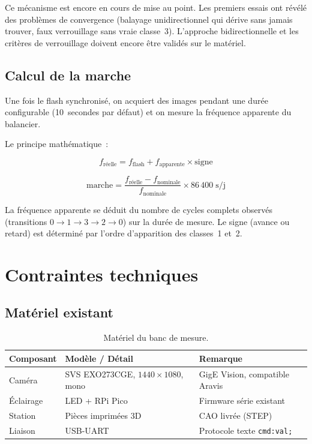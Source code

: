 \documentclass[a4paper,11pt]{article}
\newcommand{\code}[1]{\colorbox{codebg}{\texttt{#1}}}
\begin{document}
Ce mécanisme est encore en cours de mise au point. Les premiers essais ont révélé des problèmes de convergence (balayage unidirectionnel qui dérive sans jamais trouver, faux verrouillage sans vraie classe~3). L'approche bidirectionnelle et les critères de verrouillage doivent encore être validés sur le matériel.

\subsection{Calcul de la marche}

Une fois le flash synchronisé, on acquiert des images pendant une durée configurable (10~secondes par défaut) et on mesure la fréquence apparente du balancier.

Le principe mathématique~:

\begin{equation}
    f_{\text{réelle}} = f_{\text{flash}} + f_{\text{apparente}} \times \text{signe}
\end{equation}

\begin{equation}
    \text{marche} = \frac{f_{\text{réelle}} - f_{\text{nominale}}}{f_{\text{nominale}}} \times 86\,400 \;\text{s/j}
\end{equation}

La fréquence apparente se déduit du nombre de cycles complets observés (transitions $0 \to 1 \to 3 \to 2 \to 0$) sur la durée de mesure. Le signe (avance ou retard) est déterminé par l'ordre d'apparition des classes~1 et~2.

\section{Contraintes techniques}

\subsection{Matériel existant}

\begin{table}[h]
    \centering
    \begin{tabular}{l l l}
        \toprule
        \textbf{Composant} & \textbf{Modèle / Détail} & \textbf{Remarque} \\
        \midrule
        Caméra    & SVS EXO273CGE, $1440 \times 1080$, mono & GigE Vision, compatible Aravis \\
        Éclairage & LED + RPi Pico              & Firmware série existant \\
        Station   & Pièces imprimées 3D          & CAO livrée (STEP) \\
        Liaison   & USB-UART                     & Protocole texte \code{cmd:val;} \\
        \bottomrule
    \end{tabular}
    \caption{Matériel du banc de mesure.}
    \label{tab:materiel}
\end{table}
\end{document}
